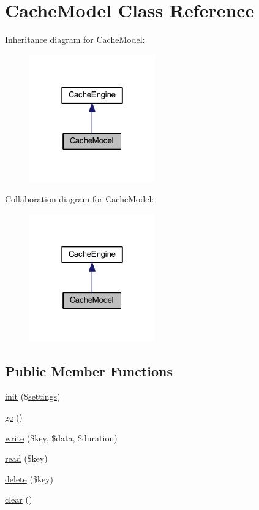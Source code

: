 \hypertarget{class_cache_model}{\section{Cache\-Model Class Reference}
\label{class_cache_model}
}


Inheritance diagram for Cache\-Model\-:
\nopagebreak
\begin{figure}[H]
\begin{center}
\leavevmode
\includegraphics[width=154pt]{class_cache_model__inherit__graph}
\end{center}
\end{figure}


Collaboration diagram for Cache\-Model\-:
\nopagebreak
\begin{figure}[H]
\begin{center}
\leavevmode
\includegraphics[width=154pt]{class_cache_model__coll__graph}
\end{center}
\end{figure}
\subsection*{Public Member Functions}
\begin{DoxyCompactItemize}
\item 
\hyperlink{class_cache_model_a5a352605cb6d44ea8c1b059e6413589c}{init} (\$\hyperlink{class_cache_engine_ad7354383714c6ae99d6ee1bfb95ab49f}{settings})
\item 
\hyperlink{class_cache_model_a14ff7ef4b198ff14884dd8c564264ca3}{gc} ()
\item 
\hyperlink{class_cache_model_adb7885262e83b806fb75be99b310eea5}{write} (\$key, \$data, \$duration)
\item 
\hyperlink{class_cache_model_a4c50c958c469c08bba0c0ccb710ca8af}{read} (\$key)
\item 
\hyperlink{class_cache_model_aa74a2edd6f3cbb5c5353f7faa97b6d70}{delete} (\$key)
\item 
\hyperlink{class_cache_model_aa821bec12eaa7e0f649397c9675ff505}{clear} ()
\end{DoxyCompactItemize}
